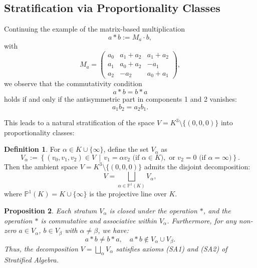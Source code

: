 \documentclass[12pt]{article}
\theoremstyle{definition}
\newtheorem{definition}{Definition}[section]
\theoremstyle{plain}
\newtheorem{proposition}[definition]{Proposition}
\theoremstyle{remark}
\begin{document}
\subsection{Stratification via Proportionality Classes}

Continuing the example of the matrix-based multiplication
\[
a * b := M_a \cdot b,
\]
with
\[
M_a =
\begin{pmatrix}
a_0 & a_1 + a_2 & a_1 + a_2 \\
a_1 & a_0 + a_2 & -a_1 \\
a_2 & -a_2 & a_0 + a_1
\end{pmatrix},
\]
we observe that the commutativity condition
\[
a * b = b * a
\]
holds if and only if the antisymmetric part in components 1 and 2 vanishes:
\[
a_1 b_2 = a_2 b_1.
\]

This leads to a natural stratification of the space \( V = K^3 \setminus \{(0,0,0)\} \) into proportionality classes:

\begin{definition}
For \( \alpha \in K \cup \{\infty\} \), define the set \( V_\alpha \) as
\[
V_\alpha := \left\{ (v_0, v_1, v_2) \in V \,\middle|\, v_1 = \alpha v_2 \text{ (if } \alpha \in K), \text{ or } v_2 = 0 \text{ (if } \alpha = \infty) \right\}.
\]
Then the ambient space \( V = K^3 \setminus \{(0,0,0)\} \) admits the disjoint decomposition:
\[
V = \bigsqcup_{\alpha \in \mathbb{P}^1(K)} V_\alpha,
\]
where \( \mathbb{P}^1(K) = K \cup \{\infty\} \) is the projective line over \( K \).
\end{definition}

\begin{proposition}
Each stratum \( V_\alpha \) is closed under the operation \( * \), and the operation \( * \) is commutative and associative within \( V_\alpha \). Furthermore, for any non-zero \( a \in V_\alpha \), \( b \in V_\beta \) with \( \alpha \ne \beta \), we have:
\[
a * b \ne b * a, \quad a * b \notin V_\alpha \cup V_\beta.
\]
Thus, the decomposition \( V = \bigsqcup_\alpha V_\alpha \) satisfies axioms \emph{(SA1)} and \emph{(SA2)} of Stratified Algebra.
\end{proposition}
\end{document}
